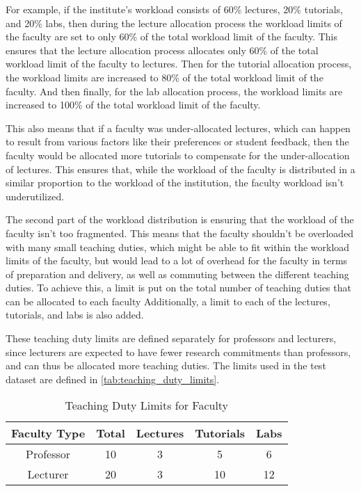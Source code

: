 For example, if the institute's workload consists of 60\% lectures, 20\% tutorials, and 20\% labs, then during the lecture allocation process the workload limits of the faculty are set to only 60\% of the total workload limit of the faculty. This ensures that the lecture allocation process allocates only 60\% of the total workload limit of the faculty to lectures. Then for the tutorial allocation process, the workload limits are increased to 80\% of the total workload limit of the faculty. And then finally, for the lab allocation process, the workload limits are increased to 100\% of the total workload limit of the faculty.

This also means that if a faculty was under-allocated lectures, which can happen to result from various factors like their preferences or student feedback, then the faculty would be allocated more tutorials to compensate for the under-allocation of lectures. This ensures that, while the workload of the faculty is distributed in a similar proportion to the workload of the institution, the faculty workload isn't underutilized.

The second part of the workload distribution is ensuring that the workload of the faculty isn't too fragmented. This means that the faculty shouldn't be overloaded with many small teaching duties, which might be able to fit within the workload limits of the faculty, but would lead to a lot of overhead for the faculty in terms of preparation and delivery, as well as commuting between the different teaching duties. To achieve this, a limit is put on the total number of teaching duties that can be allocated to each faculty Additionally, a limit to each of the lectures, tutorials, and labs is also added.

These teaching duty limits are defined separately for professors and lecturers, since lecturers are expected to have fewer research commitments than professors, and can thus be allocated more teaching duties. The limits used in the test dataset are defined in \autoref{tab:teaching_duty_limits}.

\begin{table}[H]
  \centering
  \begin{tabular}{|c|c|c|c|c|}
    \hline
    Faculty Type & Total & Lectures & Tutorials & Labs \\ \hline
    Professor    & 10    & 3        & 5         & 6    \\ \hline
    Lecturer     & 20    & 3        & 10        & 12   \\ \hline
  \end{tabular}
  \caption{Teaching Duty Limits for Faculty}
  \label{tab:teaching_duty_limits}
\end{table}

